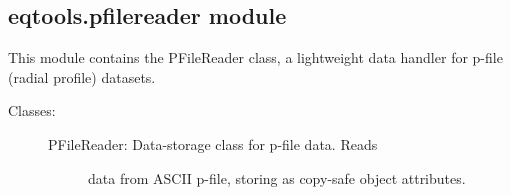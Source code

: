 \documentclass[letterpaper,10pt,english]{sphinxmanual}
\begin{document}

\begin{fulllineitems}
\label{eqtools:eqtools.filewriter.findLCFS}
\end{fulllineitems}



\subsection{eqtools.pfilereader module}
\label{eqtools:eqtools-pfilereader-module}\label{eqtools:module-eqtools.pfilereader}
This module contains the PFileReader class, a lightweight data
handler for p-file (radial profile) datasets.
\begin{description}
\item[{Classes:}] \leavevmode\begin{description}
\item[{PFileReader: Data-storage class for p-file data.  Reads}] \leavevmode
data from ASCII p-file, storing as copy-safe object
attributes.

\end{description}

\end{description}
\end{document}
